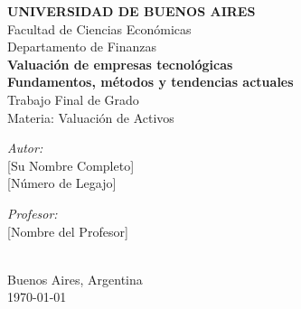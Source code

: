 \begin{titlepage}
    \centering
    
    
    {\Large \textbf{UNIVERSIDAD DE BUENOS AIRES}}\\[0.5cm]
    {\large Facultad de Ciencias Económicas}\\[0.5cm]
    {\large Departamento de Finanzas}\\[2cm]
    
    {\huge \textbf{Valuación de empresas tecnológicas}}\\[0.5cm]
    {\Large \textbf{Fundamentos, métodos y tendencias actuales}}\\[2cm]
    
    {\large Trabajo Final de Grado}\\[0.5cm]
    {\large Materia: Valuación de Activos}\\[3cm]
    
    \begin{minipage}{0.4\textwidth}
        \begin{flushleft} \large
            \emph{Autor:}\\
            {[Su Nombre Completo]}\\
            {[Número de Legajo]}
        \end{flushleft}
    \end{minipage}
    \begin{minipage}{0.4\textwidth}
        \begin{flushright} \large
            \emph{Profesor:}\\
            {[Nombre del Profesor]}
        \end{flushright}
    \end{minipage}\\[3cm]
    
    {\large Buenos Aires, Argentina}\\[0.5cm]
    {\large \today}
    
    \vfill
\end{titlepage}

\cleardoublepage 